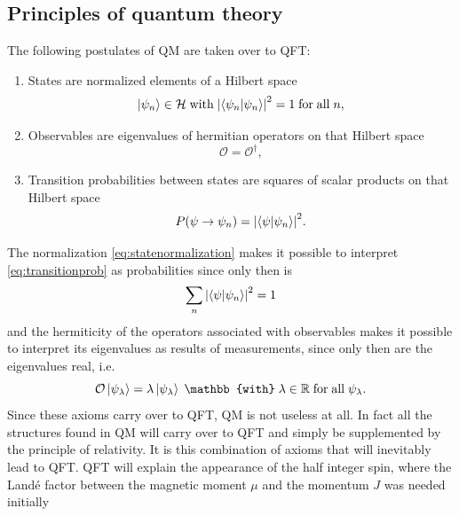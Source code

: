 \subsection{Principles of quantum theory}
\begin{mybox}{}
The following postulates of QM are taken over to QFT:
\begin{enumerate}
	\item States are normalized elements of a Hilbert space
	\begin{equation}
	\label{eq:statenormalization}
		\ket{\psi_n} \in \mathcal{H} \; \mathrm{with} \; \abs{\braket{\psi_n}{\psi_n}}^2 =1 \;\mathrm{for\;all\;} n,
	\end{equation}
	\item Observables are eigenvalues of hermitian operators on that Hilbert space
	\begin{equation}
		\mathcal{O}=\mathcal{O}^\dagger,
	\end{equation}
	\item Transition probabilities between states are squares of scalar products on that Hilbert space
	\begin{equation}
	\label{eq:transitionprob}
		P(\psi \rightarrow\psi_n) = \abs{\braket{\psi}{\psi_n}}^2.
	\end{equation}
	
\end{enumerate}
\end{mybox}
The normalization \ref{eq:statenormalization} makes it possible to interpret \ref{eq:transitionprob} as probabilities since only then is
\begin{equation}
	\sum_n \abs{\braket{\psi}{\psi_n}}^2 =1
\end{equation}
and the hermiticity of the operators associated with observables makes it possible to interpret its eigenvalues as results of measurements, since only then are the eigenvalues real, i.e.
\begin{equation}
	\mathcal{O}\ket{\psi_\lambda} = \lambda \ket{\psi_\lambda} \; \mathbb{with}\; \lambda \in \mR \mathrm{\;for\;all\;} \psi_\lambda.
\end{equation}
Since these axioms carry over to QFT, QM is not useless at all. In fact all the structures found in QM will carry over to QFT and simply be supplemented by the principle of relativity. It is this combination of axioms that will inevitably lead to QFT. QFT will explain the appearance of the half integer spin, where the Landé factor between the magnetic moment $\mu$ and the momentum $J$ was needed initially

